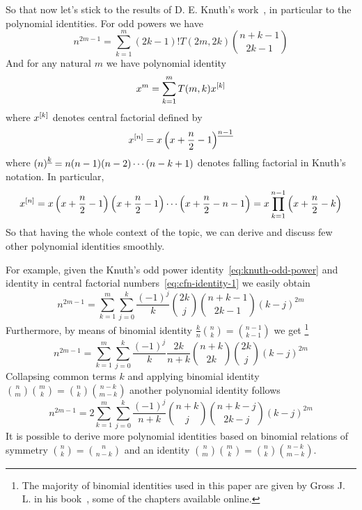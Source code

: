 So that now let's stick to the results of D. E. Knuth's work~\cite{knuth1993johann},
in particular to the polynomial identities.
For odd powers we have
\begin{equation}
    n^{2m-1} = \sum_{k=1}^{m} (2k-1)! T(2m,2k) \binom{n+k-1}{2k-1}\label{eq:knuth-odd-power}
\end{equation}
And for any natural $m$ we have polynomial identity
\begin{equation}
    x^m = \sum_{k=1}^{m} T(m, k) x^{[k]}\label{eq:knuth-power-identity}
\end{equation}
where $x^{[k]}$ denotes central factorial defined by
\begin{equation*}
    x^{[n]} = x \left(x+\frac{n}{2}-1 \right)^{\underline{n-1}}
\end{equation*}
where $\left(n \right)^{\underline{k}} = n (n-1) (n-2) \cdots (n-k+1)$ denotes falling factorial in Knuth's notation.
In particular,
\begin{equation*}
    x^{[n]}
    = x \left( x+\frac{n}{2}-1 \right) \left( x+\frac{n}{2}-1 \right) \cdots \left (x+\frac{n}{2}-n-1 \right)
    = x \prod_{k=1}^{n-1} \left( x+\frac{n}{2}-k \right)
\end{equation*}
So that having the whole context of the topic, we can derive and discuss few other polynomial identities smoothly.

For example, given the Knuth's odd power identity~\eqref{eq:knuth-odd-power}
and identity in central factorial numbers~\eqref{eq:cfn-identity-1}
we easily obtain
\begin{equation*}
    n^{2m-1} = \sum_{k=1}^{m} \sum_{j=0}^{k} \frac{(-1)^j}{k} \binom{2k}{j} \binom{n+k-1}{2k-1} (k-j)^{2m}
\end{equation*}
Furthermore, by means of binomial identity $\frac{k}{n} \binom{n}{k} = \binom{n-1}{k-1}$ we get
\footnote{The majority of binomial identities used in this paper are given by Gross J. L.
in his book~\cite{gross2016combinatorial}, some of the chapters available online.}
\begin{equation*}
    n^{2m-1} = \sum_{k=1}^{m} \sum_{j=0}^{k} \frac{(-1)^{j}}{k} \frac{2k}{n+k} \binom{n+k}{2k} \binom{2k}{j} (k-j)^{2m}
\end{equation*}
Collapsing common terms $k$ and applying binomial identity $\binom{n}{m} \binom{m}{k} = \binom{n}{k} \binom{n-k}{m-k}$
another polynomial identity follows
\begin{equation*}
    n^{2m-1} = 2\sum_{k=1}^{m} \sum_{j=0}^{k} \frac{(-1)^{j}}{n+k} \binom{n+k}{j} \binom{n+k-j}{2k-j} (k-j)^{2m}
\end{equation*}
It is possible to derive more polynomial identities based on binomial relations of symmetry $\binom{n}{k} = \binom{n}{n-k}$
and an identity $\binom{n}{m} \binom{m}{k} = \binom{n}{k} \binom{n-k}{m-k}$.

